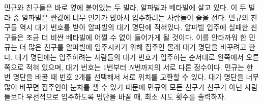 민규와 친구들은 바로 옆에 붙어있는 두 빌라, 알파빌과 베타빌에 살고 있다. 이 두 빌라 중 알파빌은 싼값에 너무 인기가 많아서 입주하려는 사람들이 줄을 선다. 민규의 친구들 역시 대기 번호를 받아 알파빌의 대기 명단에 적혀있다. 알파빌 입주에 실패한 친구들은 조금 더 비싼 베타빌에 어쩔 수 없이 들어가게 될 것이다. 이를 안타까워 한 민규는 더 많은 친구를 알파빌에 입주시키기 위해 집주인 몰래 대기 명단을 바꾸려고 한다. 대기 명단에는 입주하려는 사람들의 대기 번호가 입주하는 순서대로 왼쪽에서 오른쪽으로 적혀 있으며, 대기 번호는 $1$번부터 $N$번까지의 서로 다른 정수이다. 민규는 한 번 명단을 바꿀 때 번호 $2$개를 선택해서 서로 위치를 교환할 수 있다. 대기 명단을 너무 많이 바꾸면 집주인이 눈치를 챌 수 있기 때문에 민규의 모든 친구가 친구가 아닌 사람들보다 우선적으로 입주하도록 명단을 바꿀 때, 최소 시도 횟수를 출력하자. 
